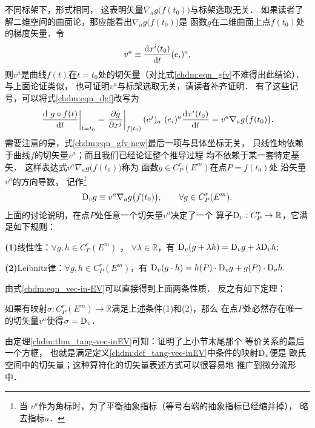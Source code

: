 不同标架下，形式相同，
这表明矢量$\nabla_a g\bigl(f(t_0)\bigr)$与标架选取无关．
如果读者了解二维空间的曲面论，那应能看出$\nabla_a g\bigl(f(t_0)\bigr)$是
函数$g$在二维曲面上点$f(t_0)$处的梯度矢量．令
\begin{equation} \label{chdm:eqn_vectmp}
    v^a \equiv \frac{{\rm d} x^i(t_0)}{{\rm d}t} (e_i)^a,
\end{equation}
则$v^a$是曲线$f(t)$在$t=t_0$处的切矢量（对比式\eqref{chdm:eqn_gfv}不难得出此结论）．
与上面论证类似，
也可证明$v^a$与标架选取无关，请读者补齐证明．
有了这些记号，可以将式\eqref{chdm:eqn_dgf}改写为
\begin{equation}\label{chdm:eqn_gfv-new}
    \left.\frac{{\rm d}\ g\circ f(t)}{{\rm d}t}\right| _{t=t_0} 
    =\left.\frac{\partial g}{\partial x^j}\right| _{f(t_0)} (e^j)_a
      \ (e_i)^a \frac{{\rm d} x^i(t_0)}{{\rm d}t} 
    =v^a \nabla_a g\bigl(f(t_0)\bigr) .
\end{equation}
需要注意的是，式\eqref{chdm:eqn_gfv-new}最后一项与具体坐标无关，
只线性地依赖于曲线$f$的切矢量$v^a$；而且我们已经论证整个推导过程
均不依赖于某一套特定基矢．
这样表达式$v^a \nabla_a g\bigl(f(t_0)\bigr)$称为
函数$g\in C^r_P(E^m)$在点$P=f(t_0)$处
沿矢量$v^a$的{\heiti 方向导数}，
记作{\footnote{当
        $v^a$作为角标时，为了平衡抽象指标（等号右端的抽象指标已经缩并掉），
        略去指标$a$．}}
\begin{equation}\label{chdm:eqn_vec-in-EV}
    {\rm D}_v g \equiv v^a \nabla_a g\bigl(f(t_0)\bigr), \qquad
    \forall g\in C^r_P(E^m).
\end{equation}
上面的讨论说明，在点$P$处任意一个切矢量$v^a$决定了一个
算子${\rm D}_v:C^r_P \to \mathbb{R}$，它满足如下规则：
\begin{definition}\label{chdm:def_tang-vec-inEV}
    {\bfseries (1)}线性性：$\forall g,h \in C^r_P(E^m) $ ， $\forall \lambda \in \mathbb{R}$，有
    ${\rm D}_v (g+\lambda h) = {\rm D}_v g+ \lambda {\rm D}_v h ;$
    
    
    {\bfseries (2)}Leibnitz律：$\forall g,h \in C^r_P(E^m) $，有
    ${\rm D}_v (g\cdot h) = h(P)\cdot {\rm D}_v g+ g(P)\cdot {\rm D}_v h .$
\end{definition}
由式\eqref{chdm:eqn_vec-in-EV}可以直接得到上面两条性质．
反之有如下定理：  
\begin{theorem}\label{chdm:thm_tang-vec-inEV}
    如果有映射$\sigma:C^r_P(E^m) \to \mathbb{R}$满足上述条件(1)和(2)，那么
    在点$P$处必然存在唯一的切矢量$v^a$使得$\sigma = {\rm D}_v$．
\end{theorem}
{\kaishu 由定理\ref{chdm:thm_tang-vec-inEV}可知：证明了上小节末尾那个
等价关系的最后一个方框}，
也就是满足定义\ref{chdm:def_tang-vec-inEV}中条件的映射${\rm D}_v$便是
欧氏空间中的{\heiti 切矢量}；这种算符化的切矢量表述方式可以很容易地
推广到微分流形中．

